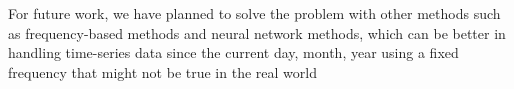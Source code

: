 \documentclass{article}
\begin{document}
For future work, we have planned to solve the problem with other methods such as frequency-based methods and neural network methods, which can be better in handling time-series data since the current day, month, year using a fixed frequency that might not be true in the real world




\newpage





\end{document}
